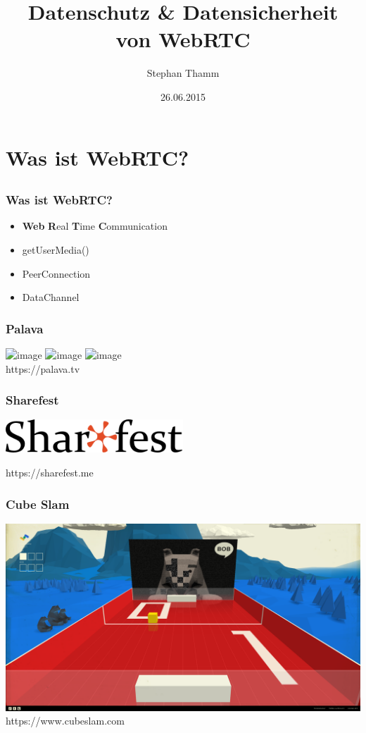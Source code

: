 \documentclass[12pt]{beamer}
\title{Datenschutz \& Datensicherheit \\ von WebRTC}
\author{Stephan Thamm}
\date{26.06.2015}
\begin{document}
\maketitle

\section{Was ist WebRTC?}
\subsection{} 

\begin{frame}
  \frametitle{Was ist WebRTC?}
  \begin{itemize}
    \item<2-> \textbf{Web} \textbf{R}eal \textbf{T}ime \textbf{C}ommunication
    \item<3-> getUserMedia()
    \item<4-> PeerConnection
    \item<5-> DataChannel
  \end{itemize}
\end{frame}

\begin{frame}
  \frametitle{Palava}
  \includegraphics<1>[height=0.7\textheight]{img/palava_1.jpg}
  \includegraphics<2>[height=0.7\textheight]{img/palava_2.jpg}
  \includegraphics<3>[height=0.7\textheight]{img/palava_3.jpg}
  \\ \hfill \tiny https://palava.tv
\end{frame}

\begin{frame}
  \frametitle{Sharefest}
  \centerline{\includegraphics[width=0.5\textwidth]{img/sharefest.png}}
  \centerline{\tiny https://sharefest.me}
\end{frame}

\begin{frame}
  \frametitle{Cube Slam}
  \includegraphics[height=0.7\textheight]{img/cube_slam.png} \\
  \hfill \tiny https://www.cubeslam.com
\end{frame}
\end{document}
